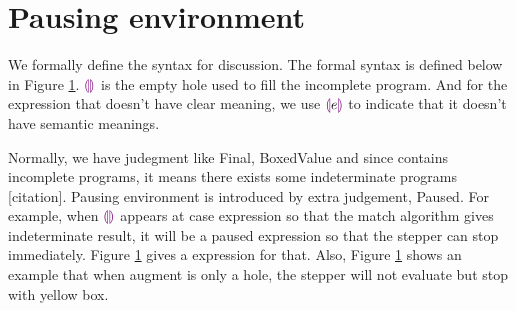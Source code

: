 \section{Pausing environment}

We formally define the syntax for discussion. The formal syntax is defined below in Figure \ref{}. $\textcolor{violet}{\llparenthesis}\textcolor{violet}{\rrparenthesis}$ is the empty hole used to fill the incomplete program. And for the expression that doesn't have clear meaning, we use $\textcolor{violet}{\llparenthesis} e \textcolor{violet}{\rrparenthesis}$ to indicate that it doesn't have semantic meanings.

Normally, we have judegment like Final, BoxedValue and since \Hazel contains incomplete programs, it means there exists some indeterminate programs [citation]. Pausing environment is introduced by extra judgement, Paused. For example, when $\textcolor{violet}{\llparenthesis}\textcolor{violet}{\rrparenthesis}$ appears at case expression so that the match algorithm gives indeterminate result, it will be a paused expression so that the stepper can stop immediately. Figure \ref{} gives a expression for that. Also, Figure \ref{} shows an example that when augment is only a hole, the stepper will not evaluate but stop with yellow box.